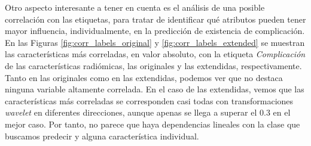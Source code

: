 Otro aspecto interesante a tener en cuenta es el análisis de una posible correlación con las etiquetas, para tratar de identificar qué atributos pueden tener mayor influencia, individualmente, en la predicción de existencia de complicación. En las Figuras \ref{fig:corr_labels_original} y \ref{fig:corr_labels_extended} se muestran las características más correladas, en valor absoluto, con la etiqueta \emph{Complicación} de las características radiómicas, las originales y las extendidas, respectivamente. Tanto en las originales como en las extendidas, podemos ver que no destaca ninguna variable altamente correlada. En el caso de las extendidas, vemos que las características más correladas se corresponden casi todas con transformaciones \emph{wavelet} en diferentes direcciones, aunque apenas se llega a superar el 0.3 en el mejor caso. Por tanto, no parece que haya dependencias lineales con la clase que buscamos predecir y alguna característica individual.



